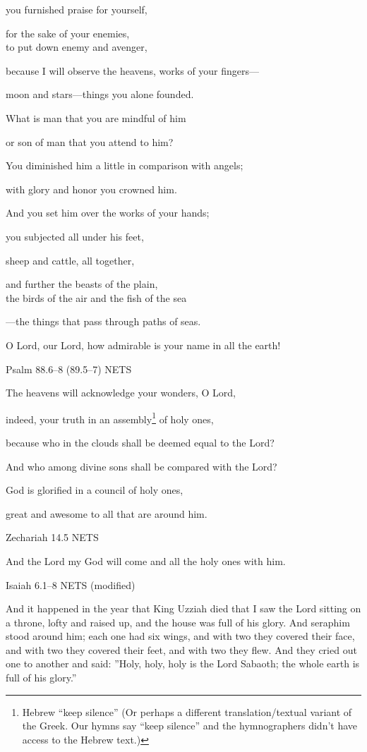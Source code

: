 \documentclass[
]{article}
\newcommand{\RL}[1]{\beginR #1\endR}
\begin{document}
you furnished praise for yourself,

for the sake of your enemies,\\
to put down enemy and avenger,

because I will observe the heavens, works of your fingers---

moon and stars---things you alone founded.

What is man that you are mindful of him

or son of man that you attend to him?

You diminished him a little in comparison with angels;

with glory and honor you crowned him.

And you set him over the works of your hands;

you subjected all under his feet,

sheep and cattle, all together,

and further the beasts of the plain,\\
the birds of the air and the fish of the sea

---the things that pass through paths of seas.

O Lord, our Lord, how admirable is your name in all the earth!

Psalm 88.6--8 (89.5--7) NETS

The heavens will acknowledge your wonders, O Lord,

indeed, your truth in an assembly\footnote{Hebrew ``keep silence'' (Or
  perhaps a different translation/textual variant of the Greek. Our
  hymns say ``keep silence'' and the hymnographers didn't have access to
  the Hebrew text.)} of holy ones,

because who in the clouds shall be deemed equal to the Lord?

And who among divine sons shall be compared with the Lord?

God is glorified in a council of holy ones,

great and awesome to all that are around him.

Zechariah 14.5 NETS

And the Lord my God will come and all the holy ones with him.

Isaiah 6.1--8 NETS (modified)

And it happened in the year that King Uzziah died that I saw the Lord
sitting on a throne, lofty and raised up, and the house was full of his
glory. And seraphim stood around him; each one had six wings, and with
two they covered their face, and with two they covered their feet, and
with two they flew. And they cried out one to another and
said:\RL{\hfill\break
''}Holy, holy, holy is the Lord Sabaoth; the whole earth is full of his
glory.''
\end{document}
